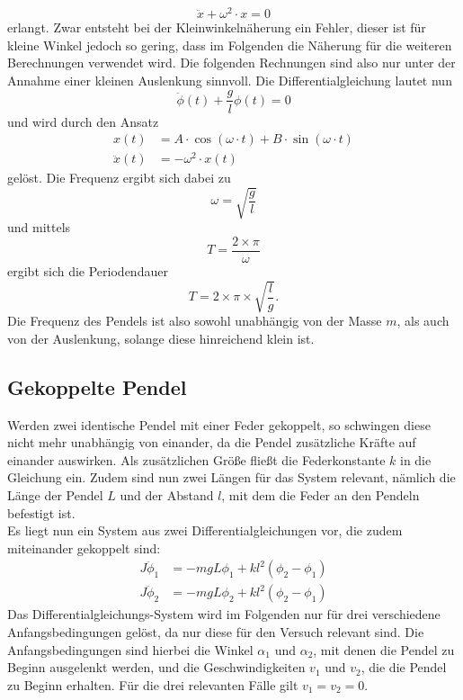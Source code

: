\begin{equation}
  \ddot{x}+\omega^2\cdot x=0 \label{eq:harmOsz}
\end{equation}
erlangt. Zwar entsteht bei der Kleinwinkelnäherung ein Fehler, dieser ist für kleine Winkel jedoch so gering, dass im Folgenden die Näherung für die weiteren Berechnungen verwendet wird.
Die folgenden Rechnungen sind also nur unter der Annahme einer kleinen Auslenkung sinnvoll.
Die Differentialgleichung lautet nun
\begin{equation}
  \ddot{\phi}(t)+\frac{g}{l}\phi(t)=0
\end{equation}
und wird durch den Ansatz
\begin{align}
  x(t)        & =A\cdot \cos(\omega\cdot t)+B\cdot \sin(\omega\cdot t) \\
  \ddot{x}(t) & =-\omega^2\cdot x(t)
  \label{eq:ansatz}
\end{align}
gelöst. Die Frequenz ergibt sich dabei zu
\begin{equation}
  \omega=\sqrt{\frac{g}{l}}
\end{equation}
und mittels
\begin{equation}
  T=\frac{2\times\pi}{\omega}
\end{equation}
ergibt sich die Periodendauer
\begin{equation}
  T=2 \times \pi \times \sqrt{\frac{l}{g}}.
  \label{eq:Periodendauer}
\end{equation}
Die Frequenz des Pendels ist also sowohl unabhängig von der Masse $m$, als auch von der Auslenkung, solange diese hinreichend klein ist.

\subsection{Gekoppelte Pendel}
Werden zwei identische Pendel mit einer Feder gekoppelt, so schwingen diese nicht mehr unabhängig von einander, da die Pendel zusätzliche Kräfte auf
einander auswirken. Als zusätzlichen Größe fließt die Federkonstante $k$ in die Gleichung ein. Zudem sind nun zwei Längen für das System relevant, nämlich die
Länge der Pendel $L$ und der Abstand $l$, mit dem die Feder an den Pendeln befestigt ist.
\\
Es liegt nun ein System aus zwei Differentialgleichungen vor, die zudem miteinander gekoppelt sind:
\begin{align}
  J\ddot{\phi}_1 & =-mgL\phi_1+kl^2(\phi_2-\phi_1) \\
  J\ddot{\phi}_2 & =-mgL\phi_2+kl^2(\phi_2-\phi_1)
\end{align}
Das Differentialgleichungs-System wird im Folgenden nur für drei verschiedene Anfangsbedingungen gelöst, da nur diese für den Versuch relevant sind.
Die Anfangsbedingungen sind hierbei die Winkel $\alpha_1$ und $\alpha_2$, mit denen die Pendel zu Beginn ausgelenkt werden, und die Geschwindigkeiten
$v_1$ und $v_2$, die die Pendel zu Beginn erhalten. Für die drei relevanten Fälle gilt $v_1=v_2=0$.

